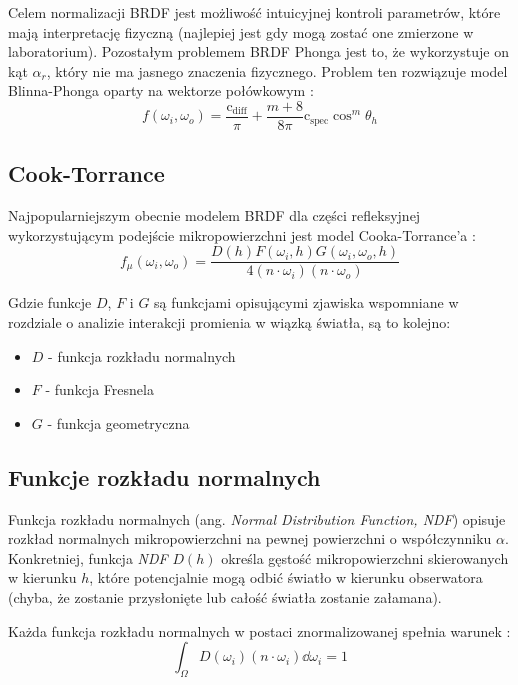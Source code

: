 \documentclass[../main.tex]{subfiles}
\newcommand{\cdiff}{\text{c}_{\text{diff}}}
\newcommand{\cspec}{\text{c}_{\text{spec}}}
\begin{document}
Celem normalizacji BRDF jest możliwość intuicyjnej kontroli parametrów, które mają interpretację fizyczną (najlepiej jest gdy mogą zostać one zmierzone w laboratorium). Pozostałym problemem BRDF Phonga jest to, że wykorzystuje on kąt $\alpha_r$, który nie ma jasnego znaczenia fizycznego. Problem ten rozwiązuje model Blinna-Phonga oparty na wektorze połówkowym \cite{RealTimeRendering2008}:
\[
  f(\omega_i, \omega_o) = \frac{\cdiff}{\pi} + \frac{m+8}{8\pi} {\cspec \cos^{m} \theta_h}
\]

\subsection{Cook-Torrance}

Najpopularniejszym obecnie modelem BRDF dla części refleksyjnej wykorzystującym podejście mikropowierzchni jest model Cooka-Torrance'a \cite{CookTorrance}:
\begin{displaymath}
  f_{\mu}(\omega_i, \omega_o) = \frac{
    D(h) F(\omega_i, h) G(\omega_i, \omega_o, h)
  }{
    4 (n \cdot \omega_i) (n \cdot \omega_o)
  }
\end{displaymath}

Gdzie funkcje $D$, $F$ i $G$ są funkcjami opisującymi zjawiska wspomniane w rozdziale o analizie interakcji promienia w wiązką światła, są to kolejno:

\begin{itemize}
  \item $D$ - funkcja rozkładu normalnych
  \item $F$ - funkcja Fresnela
  \item $G$ - funkcja geometryczna
\end{itemize}

\subsection{Funkcje rozkładu normalnych}

Funkcja rozkładu normalnych (ang. \textit{Normal Distribution Function, NDF})
opisuje rozkład normalnych mikropowierzchni na pewnej powierzchni o
współczynniku $\alpha$. Konkretniej, funkcja \textit{NDF} $D(h)$ określa
gęstość mikropowierzchni skierowanych w kierunku $h$, które potencjalnie mogą
odbić światło w kierunku obserwatora (chyba, że zostanie przysłonięte lub
całość światła zostanie załamana).

Każda funkcja rozkładu normalnych w postaci znormalizowanej spełnia warunek \cite{NDFReed}:
\[
  \int_{\Omega} {
    D(\omega_i)
    (n \cdot \omega_i)
    \dd \omega_i
  } = 1
\]
\end{document}
